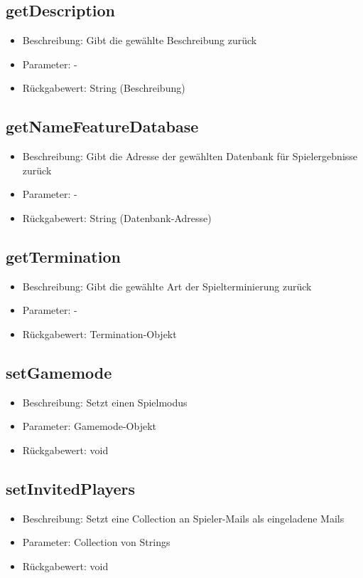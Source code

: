 \documentclass[a4paper]{scrreprt}
\begin{document}
	\subsection{getDescription}
	\begin{itemize}
		\item Beschreibung: Gibt die gewählte Beschreibung zurück
		\item Parameter: -
		\item Rückgabewert: String (Beschreibung)
	\end{itemize}
	\subsection{getNameFeatureDatabase}
	\begin{itemize}
		\item Beschreibung: Gibt die Adresse der gewählten Datenbank für Spielergebnisse zurück
		\item Parameter: -
		\item Rückgabewert: String (Datenbank-Adresse)
	\end{itemize}
	\subsection{getTermination}
	\begin{itemize}
		\item Beschreibung: Gibt die gewählte Art der Spielterminierung zurück
		\item Parameter: -
		\item Rückgabewert: Termination-Objekt
	\end{itemize}
	\subsection{setGamemode}
	\begin{itemize}
		\item Beschreibung: Setzt einen Spielmodus
		\item Parameter: Gamemode-Objekt
		\item Rückgabewert: void
	\end{itemize}
	\subsection{setInvitedPlayers}
	\begin{itemize}
		\item Beschreibung: Setzt eine Collection an Spieler-Mails als eingeladene Mails
		\item Parameter: Collection von Strings
		\item Rückgabewert: void
	\end{itemize}
\end{document}
